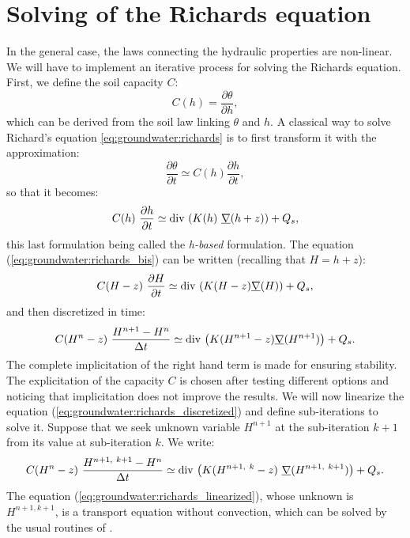 \section{Solving of the Richards equation}\label{sec:groundwater:solving_richards}

In the general case, the laws connecting the hydraulic properties are non-linear.
We will have to implement an iterative process for solving the Richards equation.
First, we define the soil capacity $C$:
\begin{equation}
 \label{eq:groundwater:c_definition}
  C(h) = \frac{\partial \theta}{\partial h},
\end{equation}
which can be derived from the soil law linking $\theta$ and $h$.
A classical way to solve Richard's equation \eqref{eq:groundwater:richards} is
to first transform it with the approximation:
\begin{equation}
\label{eq:groundwater:approximation}
\frac{\partial \theta}{\partial t} \simeq C(h) \frac{\partial h}{\partial t},
\end{equation}
so that it becomes:
\begin{equation}
\label{eq:groundwater:richards_bis}
 C(h) \ \dfrac{\partial{h}}{\partial{t}} \simeq \dive \left( K(h) \ \grad(h + z) \right) + Q_s,
\end{equation}
this last formulation being called the \textit{h-based} formulation.
The equation (\eqref{eq:groundwater:richards_bis}) can be written (recalling that $H = h + z$):
\begin{equation}
\label{eq:groundwater:richards_ter}
 C(H-z) \ \dfrac{\partial H}{\partial t} \simeq \text{div}\, \left( K(H-z) \underline{\nabla}(H) \right) + Q_s,
\end{equation}
and then discretized in time:
\begin{equation}
\label{eq:groundwater:richards_discretized}
 C(H^{n}-z) \ \frac{ H^{n+1} - H^n }{\Delta t} \simeq \text{div}\, \left( K(H^{n+1}-z) \underline{\nabla}(H^{n+1}) \right) + Q_s.
\end{equation}
The complete implicitation of the right hand term is made for ensuring stability. The explicitation of the capacity $C$
is chosen after testing different options and noticing that implicitation does not improve the results.
We will now linearize the equation (\eqref{eq:groundwater:richards_discretized}) and define sub-iterations to solve it.
Suppose that we seek unknown variable $H^{n+1}$ at the sub-iteration $k+1$ from its value at sub-iteration $k$.
We write:
\begin{equation}
\label{eq:groundwater:richards_linearized}
 C(H^{n}-z) \ \frac{H^{n+1, \ k+1} - H^n}{\Delta t} \simeq \text{div}\, \left( K(H^{n+1, \ k} - z) \ \underline{\nabla}(H^{n+1, \ k+1}) \right) + Q_s.
\end{equation}
The equation (\eqref{eq:groundwater:richards_linearized}), whose unknown is $H^{n+1, k+1}$,
is a transport equation without convection, which can be solved by the usual routines of \CS.


